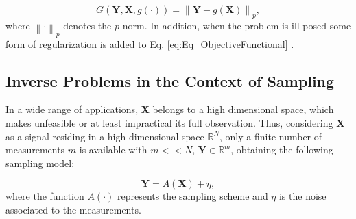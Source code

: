 \begin{equation}
\label{eq:Eq_ObjectiveFunctional}
	G(\mathbf{Y},\mathbf{X},g(\cdot)) = \left\|  \mathbf{Y} - g(\mathbf{X}) \right\|_{p} ,
\end{equation}
where $\left\|  \cdot \right\|_{p}$ denotes the $p$ norm. In addition, when the problem is ill-posed some form of regularization is added to Eq. \eqref{eq:Eq_ObjectiveFunctional} \citep{Davis_1995_a, magnant_2011a}. 






































\label{sec_intro_Relevance}
\subsection{Inverse Problems in the Context of Sampling}
\label{sec_intro_Sensing}


In a wide range of applications, $\mathbf{X}$ belongs to a high dimensional space, which makes unfeasible or at least impractical its full observation. Thus, considering $\mathbf{X}$ as a signal residing in a high dimensional space $\mathbb{R}^{N}$, only a finite number of measurements $m$ is available with $m << N$, $\mathbf{Y} \in \mathbb{R}^{m}$, obtaining the following sampling model:

\begin{equation}
\label{eq:Eq_Sensing_General_Noise_Sampling}
	\mathbf{Y} = A(\mathbf{X}) +  \eta ,
\end{equation}
where the function $A(\cdot)$ represents the sampling scheme and $\eta$ is the noise associated to the measurements. 

